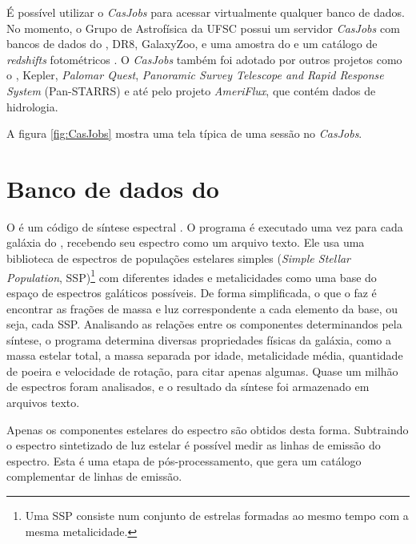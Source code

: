 É possível utilizar o {\em CasJobs} para acessar virtualmente qualquer banco de
dados. No momento, o Grupo de Astrofísica da UFSC possui um servidor {\em
CasJobs} com bancos de dados do \starlight, \SDSS DR8, GalaxyZoo\citneed, e uma
amostra do \galex e um catálogo de {\em redshifts} fotométricos
\citep{OMill2011}. O {\em CasJobs} também foi adotado por outros projetos como o
\galex, Kepler\citneed, {\em Palomar Quest}\citneed, {\em Panoramic Survey
Telescope and Rapid Response System} (Pan-STARRS) e até pelo projeto {\em
AmeriFlux}, que contém dados de hidrologia\citneed.

A figura \ref{fig:CasJobs} mostra uma tela típica de uma sessão no {\em
CasJobs}.



\section{Banco de dados do \STARLIGHT}

O \starlight é um código de síntese espectral \citep{CidFernandes2005}. O
programa é executado uma vez para cada galáxia do \SDSS, recebendo seu espectro
como um arquivo texto. Ele usa uma biblioteca de espectros de populações
estelares simples ({\em Simple Stellar Population}, SSP)\footnote{Uma SSP
consiste num conjunto de estrelas formadas ao mesmo tempo com a mesma
metalicidade.} com diferentes idades e metalicidades como uma base do espaço de
espectros galáticos possíveis. De forma simplificada, o que o \starlight faz é
encontrar as frações de massa e luz correspondente a cada elemento da base, ou
seja, cada SSP. Analisando as relações entre os componentes determinandos pela
síntese, o programa determina diversas propriedades físicas da galáxia, como a
massa estelar total, a massa separada por idade, metalicidade média, quantidade
de poeira e velocidade de rotação, para citar apenas algumas. Quase um milhão de
espectros foram analisados, e o resultado da síntese foi armazenado em arquivos
texto.

Apenas os componentes estelares do espectro são obtidos desta forma. Subtraindo
o espectro sintetizado de luz estelar é possível medir as linhas de emissão do
espectro. Esta é uma etapa de pós-processamento, que gera um catálogo
complementar de linhas de emissão.

